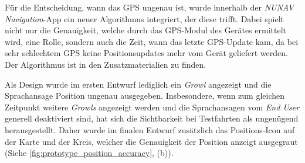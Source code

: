 Für die Entscheidung, wann das GPS ungenau ist, wurde innerhalb der \textit{NUNAV Navigation}-App ein neuer Algorithmus integriert, der diese trifft. Dabei spielt nicht nur die Genauigkeit, welche durch das GPS-Modul des Gerätes ermittelt wird, eine Rolle, sondern auch die Zeit, wann das letzte GPS-Update kam, da bei sehr schlechtem GPS keine Positionsupdates mehr vom Gerät geliefert werden. Der Algorithmus ist in den Zusatzmaterialien zu finden.

Als Design wurde im ersten Entwurf lediglich ein \textit{Growl} angezeigt und die Sprachansage \glqq Position ungenau\grqq{} ausgegeben. Insbesondere, wenn zum gleichen Zeitpunkt weitere \textit{Growls} angezeigt werden und die Sprachansagen vom \textit{End User} generell deaktiviert sind, hat sich die Sichtbarkeit bei Testfahrten als ungenügend herausgestellt. Daher wurde im finalen Entwurf zusätzlich das Positions-Icon auf der Karte und der Kreis, welcher die Genauigkeit der Position anzeigt ausgegraut (Siehe \autoref{fig:prototype_position_accuracy}, (b)).